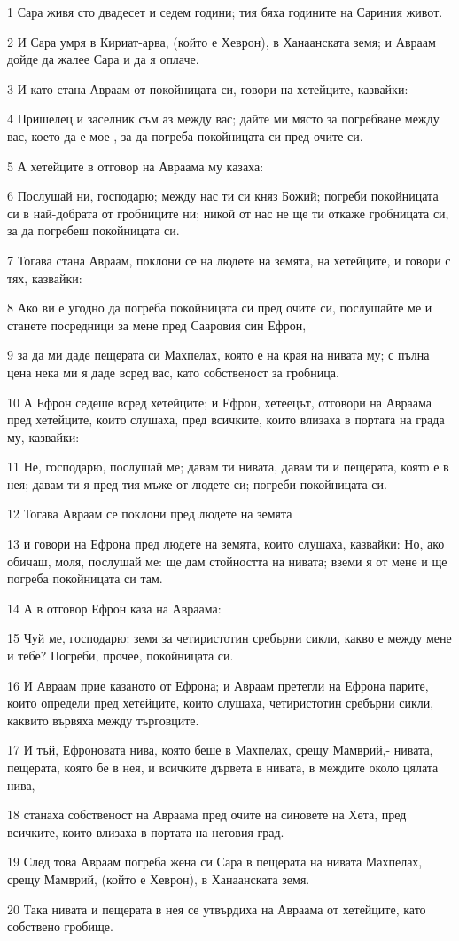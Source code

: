 \par 1 Сара живя сто двадесет и седем години; тия бяха годините на Сариния живот.
\par 2 И Сара умря в Кириат-арва, (който е Хеврон), в Ханаанската земя; и Авраам дойде да жалее Сара и да я оплаче.
\par 3 И като стана Авраам от покойницата си, говори на хетейците, казвайки:
\par 4 Пришелец и заселник съм аз между вас; дайте ми място за погребване между вас, което да е мое , за да погреба покойницата си пред очите си.
\par 5 А хетейците в отговор на Авраама му казаха:
\par 6 Послушай ни, господарю; между нас ти си княз Божий; погреби покойницата си в най-добрата от гробниците ни; никой от нас не ще ти откаже гробницата си, за да погребеш покойницата си.
\par 7 Тогава стана Авраам, поклони се на людете на земята, на хетейците, и говори с тях, казвайки:
\par 8 Ако ви е угодно да погреба покойницата си пред очите си, послушайте ме и станете посредници за мене пред Сааровия син Ефрон,
\par 9 за да ми даде пещерата си Махпелах, която е на края на нивата му; с пълна цена нека ми я даде всред вас, като собственост за гробница.
\par 10 А Ефрон седеше всред хетейците; и Ефрон, хетеецът, отговори на Авраама пред хетейците, които слушаха, пред всичките, които влизаха в портата на града му, казвайки:
\par 11 Не, господарю, послушай ме; давам ти нивата, давам ти и пещерата, която е в нея; давам ти я пред тия мъже от людете си; погреби покойницата си.
\par 12 Тогава Авраам се поклони пред людете на земята
\par 13 и говори на Ефрона пред людете на земята, които слушаха, казвайки: Но, ако обичаш, моля, послушай ме: ще дам стойността на нивата; вземи я от мене и ще погреба покойницата си там.
\par 14 А в отговор Ефрон каза на Авраама:
\par 15 Чуй ме, господарю: земя за четиристотин сребърни сикли, какво е между мене и тебе? Погреби, прочее, покойницата си.
\par 16 И Авраам прие казаното от Ефрона; и Авраам претегли на Ефрона парите, които определи пред хетейците, които слушаха, четиристотин сребърни сикли, каквито вървяха между търговците.
\par 17 И тъй, Ефроновата нива, която беше в Махпелах, срещу Мамврий,- нивата, пещерата, която бе в нея, и всичките дървета в нивата, в междите около цялата нива,
\par 18 станаха собственост на Авраама пред очите на синовете на Хета, пред всичките, които влизаха в портата на неговия град.
\par 19 След това Авраам погреба жена си Сара в пещерата на нивата Махпелах, срещу Мамврий, (който е Хеврон), в Ханаанската земя.
\par 20 Така нивата и пещерата в нея се утвърдиха на Авраама от хетейците, като собствено гробище.

